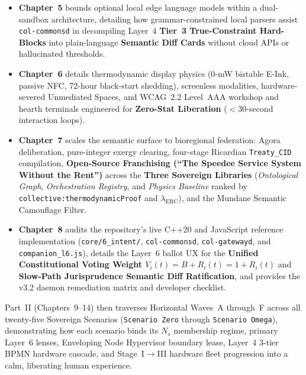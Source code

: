 \begin{itemize}
          JSON-LD payload schemas, and UX wireframes for \textit{The Pantry}, \textit{The Workshop}
          with Stage~I$\to$II$\to$III hardware fleet progression, \textit{The Bakery/Hearth} with
          $85\%/15\%$ \textit{montage} scheduling, \textit{Scenario Zero Forge Studio}, and
          \textit{The Enveloping Node Hypervisor Lens}).
    \item \textbf{Chapter~5} bounds optional local edge language models within a dual-sandbox
          architecture, detailing how grammar-constrained local parsers assist \texttt{col-commonsd}
          in decompiling Layer~4 \textbf{Tier~3 True-Constraint Hard-Blocks} into plain-language
          \textbf{Semantic Diff Cards} without cloud APIs or hallucinated thresholds.
    \item \textbf{Chapter~6} details thermodynamic display physics (0-mW bistable E-Ink, passive
          NFC, 72-hour black-start shedding), screenless modalities, hardware-severed Unmediated
          Spaces, and WCAG~2.2 Level~AAA workshop and hearth terminals engineered for
          \textbf{Zero-Stat Liberation} ($<30$-second interaction loops).
    \item \textbf{Chapter~7} scales the semantic surface to bioregional federation: Agora
          deliberation, pure-integer exergy clearing, four-stage Ricardian \texttt{Treaty\_CID}
          compilation, \textbf{Open-Source Franchising (``The Speedee Service System Without the
          Rent'')} across the \textbf{Three Sovereign Libraries} (\textit{Ontological Graph},
          \textit{Orchestration Registry}, and \textit{Physics Baseline} ranked by
          \texttt{collective:thermodynamicProof} and $\lambda_{\mathrm{ERC}}$), and the Mundane
          Semantic Camouflage Filter.
    \item \textbf{Chapter~8} audits the repository's live C++20 and JavaScript reference
          implementation (\texttt{core/6\_intent/}, \texttt{col-commonsd}, \texttt{col-gatewayd},
          and \texttt{companion\_l6.js}), details the Layer~6 ballot UX for the \textbf{Unified
          Constitutional Voting Weight $V_i(t) = B + R_i(t) = 1 + R_i(t)$} and \textbf{Slow-Path
          Jurisprudence Semantic Diff Ratification}, and provides the v3.2 daemon remediation
          matrix and developer checklist.
\end{itemize}

Part~II (Chapters~9--14) then traverses Horizontal Waves~A through~F across all twenty-five
Sovereign Scenarios (\texttt{Scenario Zero} through \texttt{Scenario Omega}), demonstrating how
each scenario binds its $N_s$ membership regime, primary Layer~6 lenses, Enveloping Node Hypervisor
boundary lease, Layer~4 3-tier BPMN hardware cascade, and Stage~I$\to$III hardware fleet
progression into a calm, liberating human experience.
